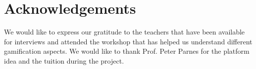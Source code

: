 \section{Acknowledgements}
We would like to express our gratitude to the teachers that have been available for interviews and attended the workshop that has helped us understand different gamification aspects. We would like to thank Prof. Peter Parnes for the platform idea and the tuition during the project.
